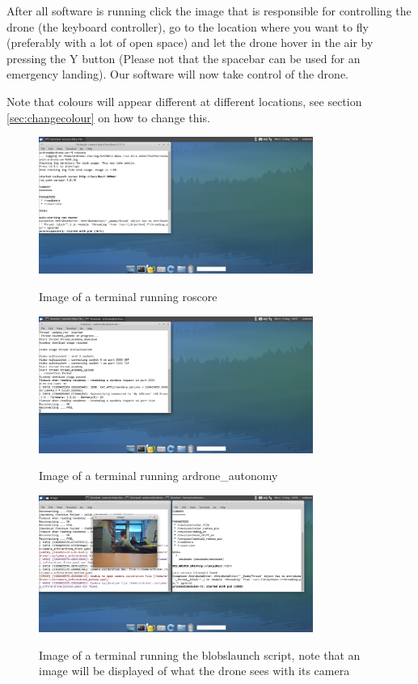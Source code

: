 \documentclass[a4paper,10pt]{article}
\begin{document}
After all software is running click the image that is responsible for controlling the drone (the keyboard controller), go to the location where you want to fly (preferably with a lot of open space) and let the drone hover in the air by pressing the Y button (Please not that the spacebar can be used for an emergency landing).
Our software will now take control of the drone. 

Note that colours will appear different at different locations, see section \ref{sec:changecolour} on how to change this. 
\begin{figure}[h!]
	\caption{Image of a terminal running roscore}
	\centering
	\includegraphics[width=0.8\textwidth]{images/roscore}
	\label{fig:roscore}
\end{figure}


\begin{figure}[h!]
	\caption{Image of a terminal running ardrone\_autonomy}
	\centering
	\includegraphics[width=0.8\textwidth]{images/ardrone_autonomy}
	\label{fig:ardrone_autonomy}
\end{figure}


\begin{figure}[h!]
	\caption{Image of a terminal running the blobslaunch script, note that an image will be displayed of what the drone sees with its camera}
	\centering
	\includegraphics[width=0.8\textwidth]{images/blobslaunch}
	\label{fig:blobslaunch}
\end{figure}
\end{document}

